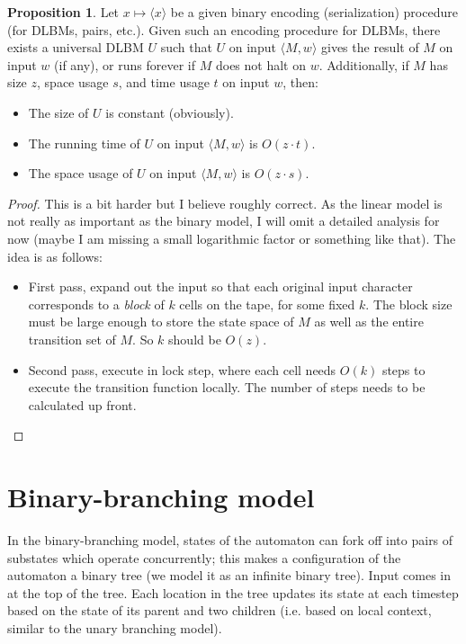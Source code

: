 \documentclass{article}
\theoremstyle{definition}
\newtheorem{prop}[thm]{Proposition}
\begin{document}
\begin{prop}
Let $x \mapsto \langle x \rangle$ be a given binary encoding (serialization)
procedure (for DLBMs, pairs, etc.).
Given such an encoding procedure for DLBMs, there exists a universal DLBM
$U$ such that
$U$ on input $\langle M, w \rangle$ gives the result of $M$ on input $w$
(if any), or runs forever if $M$ does not halt on $w$.
Additionally, if $M$ has size $z$, space usage $s$, and time usage $t$ on input $w$, then:
\begin{itemize}
\item The size of $U$ is constant (obviously).
\item The running time of $U$ on input $\langle M, w \rangle$ is $O(z \cdot t)$.
\item The space usage of $U$ on input $\langle M, w \rangle$ is $O(z \cdot s)$.
\end{itemize}
\end{prop}
\begin{proof}
This is a bit harder but I believe roughly correct.
As the linear model is not really as important as the binary model,
I will omit a detailed analysis for now (maybe I am missing a small logarithmic factor or something like that).
The idea is as follows:
\begin{itemize}
\item First pass, expand out the input so that each original input character
corresponds to a \emph{block} of $k$ cells on the tape, for some fixed $k$.
The block size must be large enough to store the state space of $M$ as
well as the entire transition set of $M$.
So $k$ should be $O(z)$.
\item Second pass, execute in lock step, where each cell needs $O(k)$ steps to execute the transition function locally. The number of steps needs to be calculated up front.
\end{itemize}
\end{proof}

\section{Binary-branching model}

In the binary-branching model, states of the automaton can fork off into pairs of substates which operate concurrently; this makes a configuration of the automaton a binary tree (we model it as an infinite binary tree). Input comes in at the top of the tree. Each location in the tree updates its state at each timestep based on the state of its parent and two children (i.e. based on local context, similar to the unary branching model).
\end{document}
